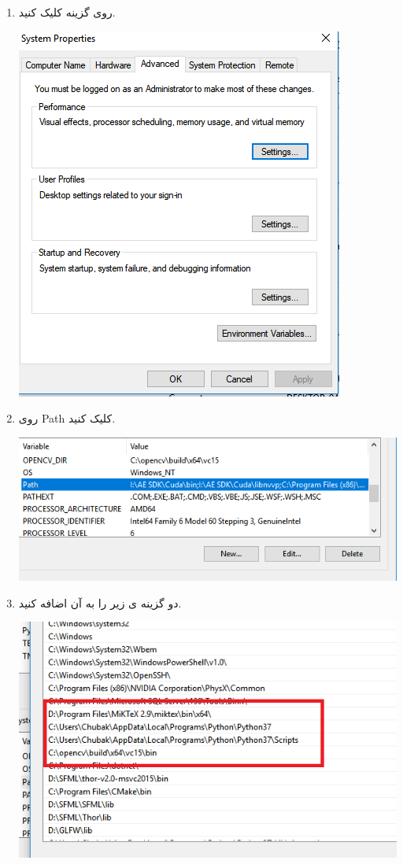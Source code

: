 \documentclass[14pt,a4paper]{memoir}
\begin{document}
\begin{enumerate}
\begin{center}
	\end{center}
\item روی گزینه  کلیک کنید.
\begin{center}
	\includegraphics[scale=1]{InstallPython_3}
\end{center}
\item روی Path  کلیک کنید.
\begin{center}
	\includegraphics[scale=1]{InstallPython_4}
\end{center}
\item دو گزینه ی زیر را به آن اضافه کنید.
\begin{center}
	\includegraphics[scale=1]{InstallPython_5}
\end{center}
\end{enumerate}
	 
\end{document}
